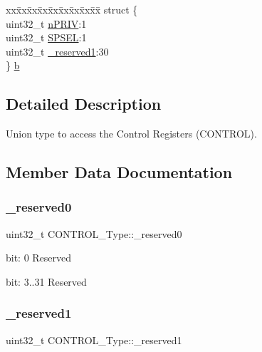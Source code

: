 \begin{DoxyCompactItemize}
\begin{tabbing}
\end{tabbing}\item 
\begin{tabbing}
xx\=xx\=xx\=xx\=xx\=xx\=xx\=xx\=xx\=\kill
struct \{\\
\>uint32\_t \mbox{\hyperlink{union_c_o_n_t_r_o_l___type_a35c1732cf153b7b5c4bd321cf1de9605}{nPRIV}}:1\\
\>uint32\_t \mbox{\hyperlink{union_c_o_n_t_r_o_l___type_a8cc085fea1c50a8bd9adea63931ee8e2}{SPSEL}}:1\\
\>uint32\_t \mbox{\hyperlink{union_c_o_n_t_r_o_l___type_aa7a5662079a447f801034d108f80ce49}{\_reserved1}}:30\\
\} \mbox{\hyperlink{union_c_o_n_t_r_o_l___type_a6103270c10459404985ad6561d199b48}{b}}\\

\end{tabbing}\end{DoxyCompactItemize}


\subsection{Detailed Description}
Union type to access the Control Registers (C\+O\+N\+T\+R\+OL). 

\subsection{Member Data Documentation}
\mbox{\label{union_c_o_n_t_r_o_l___type_af8c314273a1e4970a5671bd7f8184f50}} 
\subsubsection{\texorpdfstring{\_reserved0}{\_reserved0}}
{\footnotesize\ttfamily uint32\+\_\+t C\+O\+N\+T\+R\+O\+L\+\_\+\+Type\+::\+\_\+reserved0}

bit\+: 0 Reserved

bit\+: 3..31 Reserved \mbox{\label{union_c_o_n_t_r_o_l___type_aa7a5662079a447f801034d108f80ce49}} 
\subsubsection{\texorpdfstring{\_reserved1}{\_reserved1}}
{\footnotesize\ttfamily uint32\+\_\+t C\+O\+N\+T\+R\+O\+L\+\_\+\+Type\+::\+\_\+reserved1}

